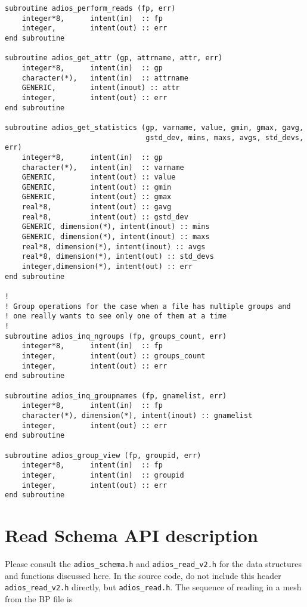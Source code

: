 \begin{lstlisting}[language=ADIOS,alsolanguage=Fortran]
subroutine adios_perform_reads (fp, err)
    integer*8,      intent(in)  :: fp
    integer,        intent(out) :: err
end subroutine

subroutine adios_get_attr (gp, attrname, attr, err)
    integer*8,      intent(in)  :: gp
    character(*),   intent(in)  :: attrname
    GENERIC,        intent(inout) :: attr
    integer,        intent(out) :: err
end subroutine

subroutine adios_get_statistics (gp, varname, value, gmin, gmax, gavg, 
                                 gstd_dev, mins, maxs, avgs, std_devs, err)
    integer*8,      intent(in)  :: gp
    character(*),   intent(in)  :: varname
    GENERIC,        intent(out) :: value
    GENERIC,        intent(out) :: gmin
    GENERIC,        intent(out) :: gmax
    real*8,         intent(out) :: gavg
    real*8,         intent(out) :: gstd_dev
    GENERIC, dimension(*), intent(inout) :: mins
    GENERIC, dimension(*), intent(inout) :: maxs
    real*8, dimension(*), intent(inout) :: avgs
    real*8, dimension(*), intent(out) :: std_devs
    integer,dimension(*), intent(out) :: err
end subroutine

!
! Group operations for the case when a file has multiple groups and 
! one really wants to see only one of them at a time
!
subroutine adios_inq_ngroups (fp, groups_count, err)
    integer*8,      intent(in)  :: fp
    integer,        intent(out) :: groups_count
    integer,        intent(out) :: err
end subroutine

subroutine adios_inq_groupnames (fp, gnamelist, err)
    integer*8,      intent(in)  :: fp
    character(*), dimension(*), intent(inout) :: gnamelist
    integer,        intent(out) :: err
end subroutine

subroutine adios_group_view (fp, groupid, err)
    integer*8,      intent(in)  :: fp
    integer,        intent(in)  :: groupid
    integer,        intent(out) :: err
end subroutine

\end{lstlisting}

\section{Read Schema API description}
Please consult the \verb+adios_schema.h+ and \verb+adios_read_v2.h+ for the data structures and functions discussed here. In the source code, do not include this header \verb+adios_read_v2.h+ directly, but \verb+adios_read.h+. The sequence of reading in a mesh from the BP file is


